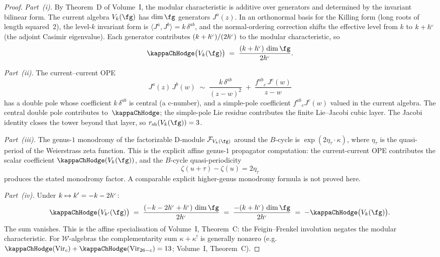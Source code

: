 \begin{proof}
\emph{Part~(i).}
By Theorem~D of Volume~I, the modular characteristic is
additive over generators and determined by the invariant bilinear
form. The current algebra $V_k(\fg)$ has $\dim\fg$ generators
$J^a(z)$. In an orthonormal basis for the Killing form
(long roots of length squared~$2$), the level-$k$ invariant form
is $\langle J^a, J^b \rangle = k\,\delta^{ab}$, and the
normal-ordering correction shifts the effective level from $k$
to $k + h^{\!\scriptscriptstyle\vee}$ (the adjoint Casimir eigenvalue). Each generator
contributes $(k + h^{\!\scriptscriptstyle\vee})/(2h^{\!\scriptscriptstyle\vee})$ to the modular characteristic,
so
\[
\kappaChHodge\bigl(V_k(\fg)\bigr)
\;=\;
\frac{(k + \hvee)\,\dim\fg}{2\hvee}.
\]

\smallskip\noindent
\emph{Part~(ii).}
The current--current OPE
\[
J^a(z)\, J^b(w)
\;\sim\;
\frac{k\, \delta^{ab}}{(z-w)^2}
\;+\;
\frac{f^{ab}{}_{c}\, J^c(w)}{z-w}
\]
has a double pole whose coefficient $k\,\delta^{ab}$ is central
(a c-number), and a simple-pole coefficient
$f^{ab}{}_{c}J^c(w)$ valued in the current algebra. The central
double pole contributes to~$\kappaChHodge$; the simple-pole Lie
residue contributes the finite Lie--Jacobi cubic layer. The Jacobi
identity closes the tower beyond that layer, so
$\dalg(V_k(\fg)) = 3$.

\smallskip\noindent
\emph{Part~(iii).}
The genus-$1$ monodromy of the factorizable D-module
$\mathcal{F}_{V_k(\fg)}$ around the $B$-cycle is
$\exp(2\eta_\tau \cdot \kappa)$, where $\eta_\tau$ is the
quasi-period of the Weierstrass zeta function. This is the
explicit affine genus-$1$ propagator computation: the
current-current OPE contributes the scalar coefficient
$\kappaChHodge(V_k(\fg))$, and the $B$-cycle quasi-periodicity
\[
\zeta(u+\tau)-\zeta(u)=2\eta_\tau
\]
produces the stated monodromy factor. A comparable explicit
higher-genus monodromy formula is not proved here.

\smallskip\noindent
\emph{Part~(iv).}
Under $k \mapsto k' = -k - 2h^{\!\scriptscriptstyle\vee}$:
\[
\kappaChHodge\bigl(V_{k'}(\fg)\bigr)
\;=\;
\frac{(-k - 2\hvee + \hvee)\,\dim\fg}{2\hvee}
\;=\;
\frac{-(k+\hvee)\,\dim\fg}{2\hvee}
\;=\;
-\kappaChHodge\bigl(V_k(\fg)\bigr).
\]
The sum vanishes.
This is the affine specialisation of Volume~I, Theorem~C:
the Feigin--Frenkel involution negates the modular
characteristic. For $\mathcal{W}$-algebras the
complementarity sum $\kappa + \kappa^!$ is generally
nonzero (e.g.\ $\kappaChHodge(\mathrm{Vir}_c)
+ \kappaChHodge(\mathrm{Vir}_{26-c}) = 13$; Volume~I, Theorem~C).
\end{proof}

